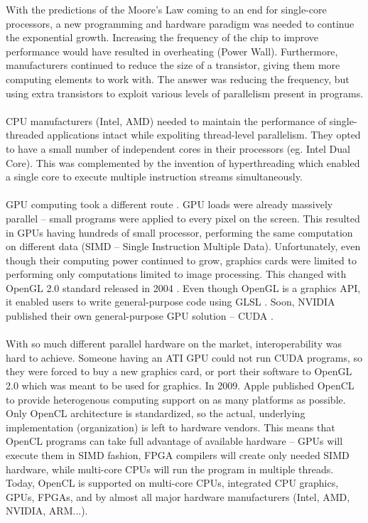 With the predictions of the Moore's Law \cite{moore1965cramming} coming to an end for single-core processors, a new programming and hardware paradigm was needed to continue the exponential growth. Increasing the frequency of the chip to improve performance would have resulted in overheating (Power Wall). Furthermore, manufacturers continued to reduce the size of a transistor, giving them more computing elements to work with. The answer was reducing the frequency, but using extra transistors to exploit various levels of parallelism present in programs.\\
\\
CPU manufacturers (Intel, AMD) needed to maintain the performance of single-threaded applications intact while expoliting thread-level parallelism. They opted to have a small number of independent cores in their processors (eg. Intel Dual Core). This was complemented by the invention of hyperthreading \cite{marr2002hyper} which enabled a single core to execute multiple instruction streams simultaneously.\\
\\
GPU computing took a different route \cite{mcclanahan2010history}. GPU loads were already massively parallel -- small programs were applied to every pixel on the screen. This resulted in GPUs having hundreds of small processor, performing the same computation on different data (SIMD -- Single Instruction Multiple Data). Unfortunately, even though their computing power continued to grow, graphics cards were limited to performing only computations limited to image processing. This changed with OpenGL 2.0 standard released in 2004 \cite{segal2004opengl}. Even though OpenGL is a graphics API, it enabled users to write general-purpose code using GLSL \cite{kessenich2004opengl}. Soon, NVIDIA published their own general-purpose GPU solution -- CUDA \cite{nvidia2007nvidia}.\\
\\
With so much different parallel hardware on the market, interoperability was hard to achieve. Someone having an ATI GPU could not run CUDA programs, so they were forced to buy a new graphics card, or port their software to OpenGL 2.0 which was meant to be used for graphics. In 2009. Apple published OpenCL \cite{munshi2009opencl} to provide heterogenous computing support on as many platforms as possible. Only OpenCL architecture is standardized, so the actual, underlying implementation (organization) is left to hardware vendors. This means that OpenCL programs can take full advantage of available hardware -- GPUs will execute them in SIMD fashion, FPGA compilers will create only needed SIMD hardware, while multi-core CPUs will run the program in multiple threads. Today, OpenCL is supported on multi-core CPUs, integrated CPU graphics, GPUs, FPGAs, and by almost all major hardware manufacturers (Intel, AMD, NVIDIA, ARM...).


